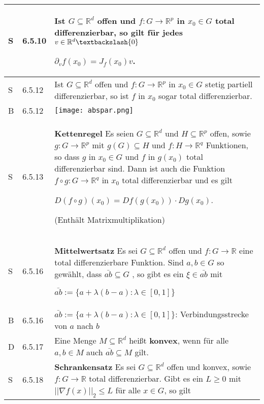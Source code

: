 \begin{longtable}{p{0.75cm} p{1cm} p{16cm}}
        \midrule
        S   & 6.5.10&   Ist $G \subseteq \mathbb{R}^d$ offen und $f: G\rightarrow \mathbb{R}^p$ in $x_0 \in G$ total differenzierbar, so gilt für jedes
                        $ v \in \mathbb{R}^d \textbackslash \{0\}$ \hfill \break
                        \centerline{$ \partial_vf(x_0) = J_f(x_0)v $.} \\
        \midrule
        S   & 6.5.12&   Ist $G \subseteq \mathbb{R}^d$ offen und $f: G\rightarrow \mathbb{R}^p$ in $x_0 \in G$ stetig partiell differenzierbar, so ist
                        $f$ in $x_0$ sogar total differenzierbar. \\
        \midrule
        B   & 6.5.12&   \texttt{[image: abspar.png]} \\
        \midrule
        S   & 6.5.13&   \textbf{Kettenregel} \hfill \break
                        Es seien $G \subseteq \mathbb{R}^d$ und $H \subseteq \mathbb{R}^p$ offen, sowie $g : G\rightarrow \mathbb{R}^p$ mit $g(G) \subseteq H$
                        und $f: H \rightarrow \mathbb{R}^q$ Funktionen, so dass $g$ in $x_0 \in G$ und $f$ in $g(x_0)$ total differenzierbar sind. Dann ist 
                        auch die Funktion $f \circ g : G \rightarrow \mathbb{R}^q$ in $x_0$ total differenzierbar und es gilt \hfill \break
                        \centerline{$ D(f\circ g)(x_0) = Df(g(x_0)) \cdot Dg(x_0) $.} 
                        (Enthält Matrixmultiplikation)\\
        \midrule
        S   & 6.5.16&   \textbf{Mittelwertsatz} \hfill \break
                        Es sei $G \subseteq \mathbb{R}^d$ offen und $f : G \rightarrow \mathbb{R}$ eine total differenzierbare Funktion. Sind 
                        $a,b \in G$ so gewählt, dass $\bar{ab} \subseteq G$ , so gibt es ein $\xi \in \bar{ab}$ mit \hfill \break
                        \centerline{$\bar{ab} := \{ a + \lambda (b-a) : \lambda \in [0,1]\} $} \\
        \midrule
        B   & 6.5.16&   $\bar{ab} := \{a+\lambda(b-a):\lambda \in [0,1]\}$: Verbindungsstrecke von $a$ nach $b$ \\
        \midrule
        D   & 6.5.17&   Eine Menge $M \subseteq \mathbb{R}^d$ heißt \textbf{konvex}, wenn für alle $a,b \in M$ auch $\bar{ab} \subseteq M$ gilt. \\
        \midrule
        S   & 6.5.18&   \textbf{Schrankensatz} \hfill \break
                        Es sei $G \subseteq \mathbb{R}^d$ offen und konvex, sowie $f: G \rightarrow \mathbb{R}$ total differenzierbar. Gibt es ein
                        $L \geq 0$ mit $||\nabla f(x)||_2 \leq L$ für alle $x \in G$, so gilt \hfill \break

\end{longtable}
